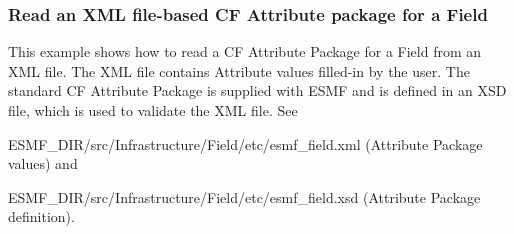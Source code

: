  
\setlength{\oldparskip}{\parskip}
\setlength{\parskip}{1.5ex}
\setlength{\oldparindent}{\parindent}
\setlength{\parindent}{0pt}
\setlength{\oldbaselineskip}{\baselineskip}
\setlength{\baselineskip}{11pt}
 
\def\bv{\begin{verbatim}}
\def\ev{\end{verbatim}}
\def\be{\begin{equation}}
\def\ee{\end{equation}}
\def\bea{\begin{eqnarray}}
\def\eea{\end{eqnarray}}
\def\bi{\begin{itemize}}
\def\ei{\end{itemize}}
\def\bn{\begin{enumerate}}
\def\en{\end{enumerate}}
\def\bd{\begin{description}}
\def\ed{\end{description}}
\def\({\left (}
\def\){\right )}
\def\[{\left [}
\def\]{\right ]}
\def\<{\left  \langle}
\def\>{\right \rangle}
\def\cI{{\cal I}}
\def\diag{\mathop{\rm diag}}
\def\tr{\mathop{\rm tr}}


 

   \subsubsection{Read an XML file-based CF Attribute package for a Field}
   This example shows how to read a CF Attribute Package for a Field from an
   XML file.  The XML file contains Attribute values filled-in by the user.
   The standard CF Attribute Package is supplied with ESMF and is defined in
   an XSD file, which is used to validate the XML file.  See
   \begin{description}
   \item ESMF\_DIR/src/Infrastructure/Field/etc/esmf\_field.xml (Attribute Package values) and
   \item ESMF\_DIR/src/Infrastructure/Field/etc/esmf\_field.xsd (Attribute Package definition).
   \end{description} 

